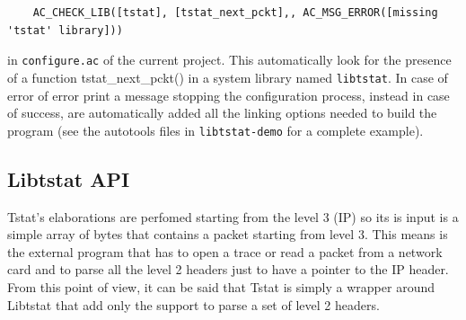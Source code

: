 \documentclass[11pt]{article}
\begin{document}
\begin{small}\begin{verbatim}
    AC_CHECK_LIB([tstat], [tstat_next_pckt],, AC_MSG_ERROR([missing 'tstat' library]))
\end{verbatim}\end{small} \noindent
in \texttt{configure.ac} of the current project. This automatically
look for the presence of a function tstat\_next\_pckt() in a system library
named \texttt{libtstat}. In case of error of error print a message stopping the
configuration process, instead in case of success, are automatically added
all the linking options needed to build the program (see the autotools 
files in \texttt{libtstat-demo} for a complete example).

\subsection{Libtstat API\label{Libtstat_API}}


Tstat's elaborations are perfomed starting from the level 3 (IP) so
its is input is a simple array of bytes that contains a packet
starting from level 3. This means is the external program that
has to open a trace or read a packet from a network card and to
parse all the level 2 headers just to have a pointer to the IP header.
From this point of view, it can be said that Tstat is simply a wrapper
around Libtstat that add only the support to parse a set of level 2
headers.
\end{document}

